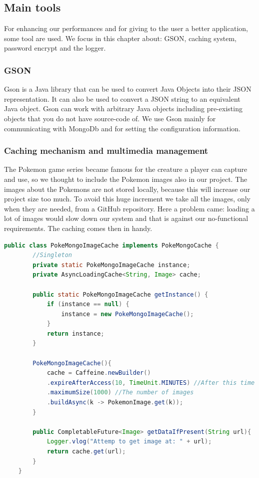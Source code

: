 
\subsection{Main tools}
For enhancing our performances and for giving to the user a better application, some tool are used. We focus in this chapter about: GSON, caching system, password encrypt and the logger.
\subsubsection{GSON}
Gson is a Java library that can be used to convert Java Objects into their JSON representation. It can also be used to convert a JSON string to an equivalent Java object. Gson can work with arbitrary Java objects including pre-existing objects that you do not have source-code of.
We use Gson mainly for communicating with MongoDb and for setting the configuration information.
\subsubsection{Caching mechanism and multimedia management}
The Pokemon game series became famous for the creature a player can capture and use, so we thought to include the Pokemon images also in our project.
The images about the Pokemons are not stored locally, because this will increase our project size too much. To avoid this huge increment we take all the images, only when they are needed, from a GitHub repository. Here a problem came: loading a lot of images would slow down our system and that is against our no-functional requirements. The caching comes then in handy.

\begin{lstlisting}[language=Java]
	public class PokeMongoImageCache implements PokeMongoCache {
		//Singleton
		private static PokeMongoImageCache instance;
		private AsyncLoadingCache<String, Image> cache;
		
		public static PokeMongoImageCache getInstance() {
			if (instance == null) {
				instance = new PokeMongoImageCache();
			}
			return instance;
		}
		
		PokeMongoImageCache(){
			cache = Caffeine.newBuilder()
			.expireAfterAccess(10, TimeUnit.MINUTES) //After this time without read/write the resource is deallocated
			.maximumSize(1000) //The number of images
			.buildAsync(k -> PokemonImage.get(k));
		}
		
		public CompletableFuture<Image> getDataIfPresent(String url){
			Logger.vlog("Attemp to get image at: " + url);
			return cache.get(url);
		}
	}
\end{lstlisting}

